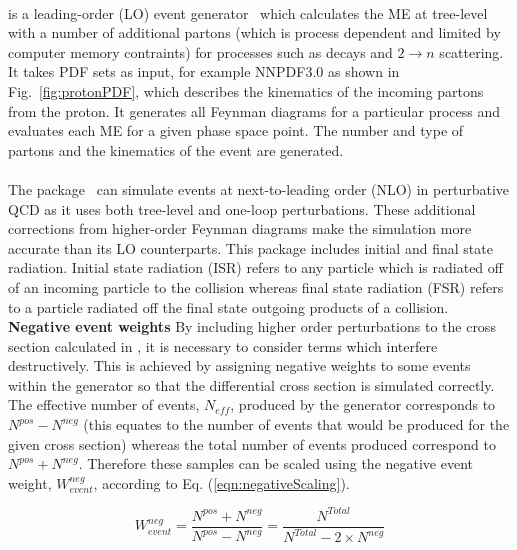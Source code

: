 \textbf{\MADGRAPH}\\
\MADGRAPH is a leading-order (LO) event generator~\cite{Alwall2011} which calculates the ME at tree-level with a number of additional partons (which is process dependent and 	limited by computer memory contraints) for processes such as decays and $2\rightarrow n$ scattering. It takes PDF sets as input, for example NNPDF3.0 as shown in Fig.~\ref{fig:protonPDF}, which describes the kinematics of the incoming partons from the proton. It generates all Feynman diagrams for a particular process and evaluates each ME for a given phase space point. The number and type of partons and the kinematics of the event are generated.\\
\textbf{\aMCATNLO}\\
The \aMCATNLO package~\cite{Degrande:2014sta} can simulate events at next-to-leading order (NLO) in perturbative QCD as it uses both tree-level and one-loop perturbations. These additional corrections from higher-order Feynman diagrams make the simulation more accurate than its LO counterparts. This package includes initial and final state radiation. Initial state radiation (ISR) refers to any particle which is radiated off of an incoming particle to the collision whereas final state radiation (FSR) refers to a particle radiated off the final state outgoing products of a collision.\\
\textbf{Negative event weights}
By including higher order perturbations to the cross section calculated in \aMCATNLO, it is necessary to consider terms which interfere destructively. This is achieved by assigning negative weights to some events within the generator so that the differential cross section is simulated correctly. The effective number of events, $N_{eff}$, produced by the generator corresponds to $N^{pos} - N^{neg}$ (this equates to the number of events that would be produced for the given cross section) whereas the total number of events produced correspond to $N^{pos} + N^{neg}$. Therefore these samples can be scaled using the negative event weight, $W_{event}^{neg}$, according to Eq. (\ref{eqn:negativeScaling}).

\begin{equation}
\label{eqn:negativeScaling}
W_{event}^{neg} = \frac{N^{pos} + N^{neg}}{N^{pos} - N^{neg}} = \frac{N^{Total}}{ N^{Total} - 2\times N^{neg}}
\end{equation}


